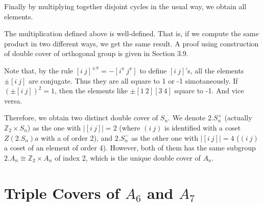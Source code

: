 \documentclass[a4paper,11pt]{article}
\def\subtitle#1{\section{#1}}
\begin{document}
Finally by multiplying together disjoint cycles in the usual way, we obtain all elements.

The multiplication defined above is well-defined. That is, if we compute the same product in two different ways, we get the same result. A proof using construction of double cover of orthogonal group is given in Section 3.9.

Note that, by the rule $[i\ j]^{\pm\pi}=-[i^\pi\ j^\pi]$ to define $[i\ j]$'s, all the elements $\pm [i\ j]$ are conjugate. Thus they are all square to 1 or -1 simotaneously. If $(\pm[i\ j])^2=1$, then the elements like $\pm[1\ 2][3\ 4]$ square to -1. And vice versa. 

Therefore, we obtain two distinct double cover of $S_n$. We denote $2.S_n^+$ (actually $\mathbb{Z}_2\times S_n$) as the one with $|[i\ j]|=2$ (where $(i\ j)$ is identified with a coset $Z(2.S_n)a$ with a of order 2), and $2.S_n^-$ as the other one with $|[i\ j]|=4$ ($(i\ j)$ a coset of an element of order 4). However, both of them has the same subgroup $2.A_n\cong \mathbb{Z}_2\times A_n$ of index 2, which is the unique double cover of $A_n$.


\subtitle{Triple Covers of $A_6$ and $A_7$}




\ifx\ChapTwoSecSeven\undefined %
     
\end{document}
